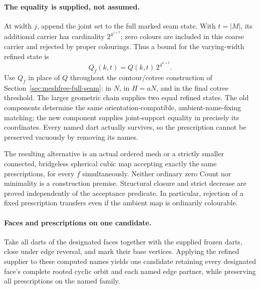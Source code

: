 \paragraph{The equality is supplied, not assumed.}
At width $j$, append the joint set to the full marked seam state. With
$t=|M|$, its additional carrier has cardinality $2^{4^{j+t}}$; zero colours
are included in this coarse carrier and rejected by proper colourings.
Thus a bound for the varying-width refined state is
\[
 Q_f(k,t)=Q(k,t)\,2^{4^{k+t}}.
\]
Use $Q_f$ in place of $Q$ throughout the contour/cotree construction of
Section~\ref{sec:meshfree-full-seam}: in $N$, in $H=aN$, and in the final
cotree threshold. The larger geometric chain supplies two equal refined
states. The old components determine the same orientation-compatible,
ambient-name-fixing matching; the new component supplies joint-support
equality in precisely its coordinates. Every named dart actually survives,
so the prescription cannot be preserved vacuously by removing its names.

The resulting alternative is an actual ordered mesh or a strictly smaller
connected, bridgeless spherical cubic map accepting exactly the same
prescriptions, for every $f$ simultaneously. Neither ordinary zero Count
nor minimality is a construction premise. Structural closure and strict
decrease are proved independently of the acceptance predicate. In
particular, rejection of a fixed prescription transfers even if the ambient
map is ordinarily colourable.

\paragraph{Faces and prescriptions on one candidate.}
Take all darts of the designated faces together with the supplied frozen
darts, close under edge reversal, and mark their base vertices. Applying
the refined supplier to these computed names yields one candidate retaining
every designated face's complete rooted cyclic orbit and each named edge
partner, while preserving all prescriptions on the named family.

